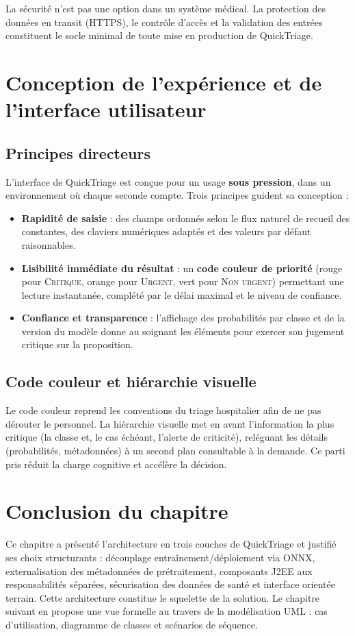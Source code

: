 \begin{warningbox}
La sécurité n'est pas une option dans un système médical. La protection des données en transit
(HTTPS), le contrôle d'accès et la validation des entrées constituent le socle minimal de toute
mise en production de QuickTriage.
\end{warningbox}

\section{Conception de l'expérience et de l'interface utilisateur}

\subsection{Principes directeurs}
L'interface de QuickTriage est conçue pour un usage \textbf{sous pression}, dans un
environnement où chaque seconde compte. Trois principes guident sa conception :
\begin{itemize}
  \item \textbf{Rapidité de saisie} : des champs ordonnés selon le flux naturel de recueil des
  constantes, des claviers numériques adaptés et des valeurs par défaut raisonnables.
  \item \textbf{Lisibilité immédiate du résultat} : un \textbf{code couleur de priorité}
  (rouge pour \textsc{Critique}, orange pour \textsc{Urgent}, vert pour \textsc{Non urgent})
  permettant une lecture instantanée, complété par le délai maximal et le niveau de confiance.
  \item \textbf{Confiance et transparence} : l'affichage des probabilités par classe et de la
  version du modèle donne au soignant les éléments pour exercer son jugement critique sur la
  proposition.
\end{itemize}

\subsection{Code couleur et hiérarchie visuelle}
Le code couleur reprend les conventions du triage hospitalier afin de ne pas dérouter le
personnel. La hiérarchie visuelle met en avant l'information la plus critique (la classe et,
le cas échéant, l'alerte de criticité), reléguant les détails (probabilités, métadonnées) à un
second plan consultable à la demande. Ce parti pris réduit la charge cognitive et accélère la
décision.

\section*{Conclusion du chapitre}
Ce chapitre a présenté l'architecture en trois couches de QuickTriage et justifié ses choix
structurants : découplage entraînement/déploiement via ONNX, externalisation des métadonnées
de prétraitement, composants J2EE aux responsabilités séparées, sécurisation des données de
santé et interface orientée terrain. Cette architecture constitue le squelette de la solution.
Le chapitre suivant en propose une vue formelle au travers de la modélisation UML : cas
d'utilisation, diagramme de classes et scénarios de séquence.
